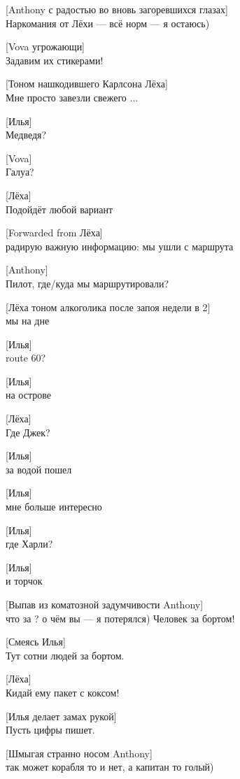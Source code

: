[Anthony с радостью во вновь загоревшихся глазах]\\
Наркомания от Лёхи --- всё норм --- я остаюсь)


[Vova угрожающи]\\
Задавим их стикерами!


[Тоном нашкодившего Карлсона Лёха]\\
Мне просто завезли свежего ...


[Илья]\\
Медведя?


[Vova]\\
Галуа?


[Лёха]\\
Подойдёт любой вариант


[Forwarded from Лёха]\\
радирую важную информацию: мы ушли с маршрута


[Anthony]\\
Пилот, где/куда мы маршрутировали?


[Лёха тоном алкоголика после запоя недели в 2]\\
мы на дне


[Илья]\\
route 60?


[Илья]\\
на острове


[Лёха]\\
Где Джек?


[Илья]\\
за водой пошел


[Илья]\\
мне больше интересно


[Илья]\\
где Харли?


[Илья]\\
и торчок


[Выпав из коматозной задумчивости Anthony]\\
что за ? о чём вы --- я потерялся) Человек за бортом!


[Смеясь Илья]\\
Тут сотни людей за бортом.


[Лёха]\\
Кидай ему пакет с коксом!


[Илья делает замах рукой]\\
Пусть цифры пишет.


[Шмыгая странно носом Anthony]\\
так может корабля то и нет, а капитан то голый)



